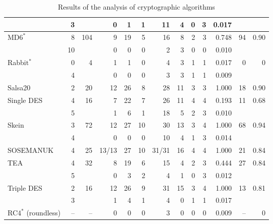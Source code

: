 \documentclass[
  digital,  	%
  color,		%
  oneside,   	%
  12pt,
  nocover,
  notable,
  nolof,
  nolot,
]{fithesis3}
\newcommand{\rd}{\cellcolor{red!40}}
\newcommand{\cone}{\cellcolor{lvl1}}
\newcommand{\ctwo}{\cellcolor{lvl2}}
\newcommand{\cfour}{\cellcolor{lvl4}}
\theoremstyle{definition}
\theoremstyle{remark}
\begin{document}
\begin{table}[H]
\begin{nomar}
{\begin{tabular}{@{}lrrrrrrrrrrrr@{}}
           &  3 &     &  0 &  1 &  1 & \rd11 &  \rd4 &  0 &  \rd3 & 0.017 &  & \\ \midrule
MD$\text{6}^{\ast}$         &  8 & 104 &  \rd9 & \rd19 &  \rd5 & \rd16 &  \rd8 &  \rd2 &  \rd3 & \rd0.748 & 94 & \cone 0.90 \\
           & 10 &     &  0 &  0 &  0 &  2 &  \rd3 &  0 &  0 & 0.010 &  & \\ \midrule
Rabbi$\text{t}^{\ast}$      &  0 &   4 &  1 &  1 &  0 &  \rd4 &  \rd3 &  1 &  1 & 0.017 & 0 & \cfour 0 \\
           &  4 &     &  0 &  0 &  0 &  3 &  \rd3 &  1 &  1 & 0.009    &  & \\ \midrule
Salsa20    &  2 &  20 & \rd12 & \rd26 &  \rd8 & \rd28 & \rd11 &  \rd3 &  \rd3 & \rd1.000 & 18 & \cone 0.90 \\ \midrule
Single DES &  4 &  16 &  \rd7 & \rd22 &  \rd7 & \rd26 & \rd11 &  \rd4 &  \rd4 & \rd0.193 & 11 & \ctwo 0.68 \\
           &  5 &     &  1 &  \rd6 &  1 & \rd18 &  \rd5 &  \rd2 &  \rd3 & 0.010 &  & \\ \midrule
Skein      &  3 &  72 & \rd12 & \rd27 & \rd10 & \rd30 & \rd13 &  \rd3 &  \rd4 & \rd1.000 & 68 & \cone 0.94 \\
           &  4 &     &  0 &  0 &  0 & \rd10 &  \rd4 &  1 &  \rd3 & 0.014 &  & \\ \midrule
SOSEMANUK  &  4 &  25 & \rd13/13 &\rd27& \rd10 &\rd31/31& \rd16 & \rd4  &  \rd4 & \rd1.000 & 21 & \cone 0.84 \\ \midrule
TEA        &  4 &  32 & \rd8 & \rd19 &  \rd6 & \rd15 & \rd4 &  \rd2 &  \rd3 & \rd0.444 & 27 & \cone 0.84 \\
           &  5 &     &  0 &  3 &  2 &  \rd4 &  1 &  0 &  \rd3 & 0.012 &  & \\ \midrule
Triple DES &  2 &  16 & 1\rd2 & \rd26 &  \rd9 & \rd31 & \rd15 &  \rd3 &  \rd4 & \rd1.000 & 13 & \cone 0.81 \\
           &  3 &     &  1 &  \rd4 &  1 &  \rd4 &  0 &  1 &  1 & 0.017 &  & \\ \midrule
RC$\text{4}^{\ast}$  (roundless) & -- & -- & 0 & 0 & 0 & 3 & 0 & 0 & 0 & 0.009 & -- & \cfour 0 \\
\bottomrule
\end{tabular}
}

\end{nomar}
\caption{Results of the analysis of cryptographic algorithms}
\label{tab:crypto_alg_analysis}
\end{table}
\end{document}
